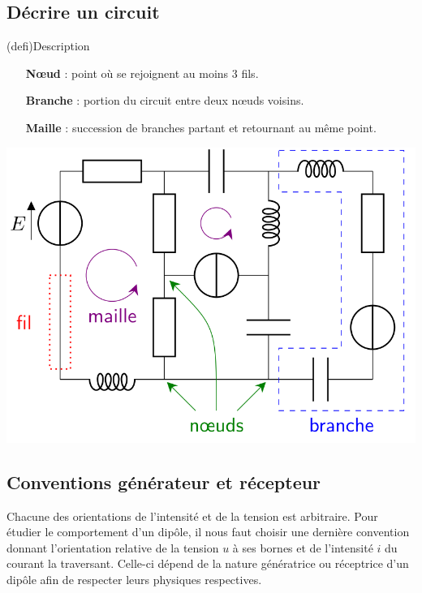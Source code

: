 \documentclass[../../main/main.tex]{subfiles}
\begin{document}
\subsection{Décrire un circuit}
\begin{tcb}[label=def:descri, sidebyside, righthand ratio=.4](defi){Description}
	\begin{itemize}[leftmargin=50pt]
		\item[\textbf{Nœud}]: point où se rejoignent au moins 3 fils.
		\item[\textbf{Branche}]: portion du circuit entre deux nœuds
		voisins.
		\item[\textbf{Maille}]: succession de branches partant et retournant
		au même point.
	\end{itemize}
	\tcblower
	\begin{center}
		\includegraphics[width=\linewidth]{circuit_voca}
	\end{center}
\end{tcb}

\subsection{Conventions générateur et récepteur}
Chacune des orientations de l'intensité et de la tension est arbitraire. Pour
étudier le comportement d'un dipôle, il nous faut choisir une dernière
convention donnant l'orientation relative de la tension $u$ à ses bornes et de
l'intensité $i$ du courant la traversant. Celle-ci dépend de la nature
génératrice ou réceptrice d'un dipôle afin de respecter leurs physiques
respectives.

\end{document}
